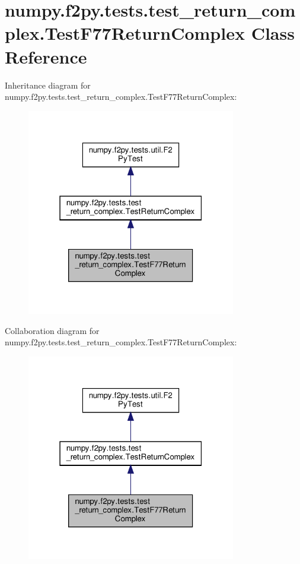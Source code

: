 \hypertarget{classnumpy_1_1f2py_1_1tests_1_1test__return__complex_1_1TestF77ReturnComplex}{}\section{numpy.\+f2py.\+tests.\+test\+\_\+return\+\_\+complex.\+Test\+F77\+Return\+Complex Class Reference}
\label{classnumpy_1_1f2py_1_1tests_1_1test__return__complex_1_1TestF77ReturnComplex}


Inheritance diagram for numpy.\+f2py.\+tests.\+test\+\_\+return\+\_\+complex.\+Test\+F77\+Return\+Complex\+:
\nopagebreak
\begin{figure}[H]
\begin{center}
\leavevmode
\includegraphics[width=259pt]{classnumpy_1_1f2py_1_1tests_1_1test__return__complex_1_1TestF77ReturnComplex__inherit__graph}
\end{center}
\end{figure}


Collaboration diagram for numpy.\+f2py.\+tests.\+test\+\_\+return\+\_\+complex.\+Test\+F77\+Return\+Complex\+:
\nopagebreak
\begin{figure}[H]
\begin{center}
\leavevmode
\includegraphics[width=259pt]{classnumpy_1_1f2py_1_1tests_1_1test__return__complex_1_1TestF77ReturnComplex__coll__graph}
\end{center}
\end{figure}
